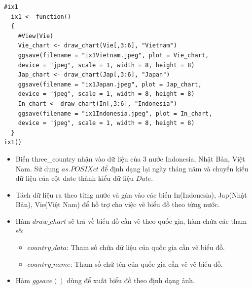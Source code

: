 \documentclass[a4paper]{article}
\theoremstyle{definition}
\begin{document}
\begin{enumerate}[i)]
\begin{enumerate}[1)]
\begin{lstlisting}[frame=single]
  #ix1
  ix1 <- function()
  {
    #View(Vie)
    Vie_chart <- draw_chart(Vie[,3:6], "Vietnam")
    ggsave(filename = "ix1Vietnam.jpeg", plot = Vie_chart, 
    device = "jpeg", scale = 1, width = 8, height = 8)
    Jap_chart <- draw_chart(Jap[,3:6], "Japan")
    ggsave(filename = "ix1Japan.jpeg", plot = Jap_chart, 
    device = "jpeg", scale = 1, width = 8, height = 8)
    In_chart <- draw_chart(In[,3:6], "Indonesia")
    ggsave(filename = "ix1Indonesia.jpeg", plot = In_chart, 
    device = "jpeg", scale = 1, width = 8, height = 8)
  }
ix1()
        \end{lstlisting}
        \begin{itemize}
            \item Biến three\_country nhận vào dữ liệu của 3 nước Indonesia, Nhật Bản, Việt Nam. Sử dụng $as.POSIXct$ để định dạng lại ngày tháng năm và chuyển kiểu dữ liệu của cột date thành kiểu dữ liệu $Date$.\\
            \item Tách dữ liệu ra theo từng nước và gán vào các biến In(Indonesia),
            Jap(Nhật Bản), Vie(Việt Nam) để hỗ trợ cho việc vẽ biểu đồ theo từng nước.\\
            \item Hàm $draw\_chart$ sẽ trả về biểu đồ cần vẽ theo quốc gia, hàm chứa các tham số:\\
                \begin{itemize}
                    \item $country\_data$: Tham số chứa dữ liệu của quốc gia cần vẽ biểu đồ.\\
                    \item $country\_name$: Tham số chứ tên của quốc gia cần vẽ vẽ biểu đồ.\\
                \end{itemize}
            \item Hàm $ggsave()$ dùng để xuất biểu đồ theo định dạng ảnh.\\
        \end{itemize}
        \newpage
        \begin{figure}[h!]
            \centering

\end{figure}
\end{enumerate}
\end{enumerate}
\end{document}
